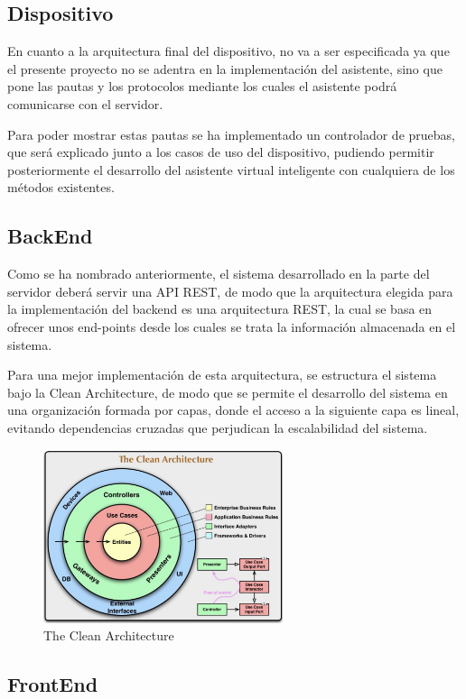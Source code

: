 \subsection{Dispositivo}

En cuanto a la arquitectura final del dispositivo, no va a ser especificada ya que el presente proyecto no se adentra en la implementación del asistente, sino que pone las pautas y los protocolos mediante los cuales el asistente podrá comunicarse con el servidor.

Para poder mostrar estas pautas se ha implementado un controlador de pruebas, que será explicado junto a los casos de uso del dispositivo, pudiendo permitir posteriormente el desarrollo del asistente virtual inteligente con cualquiera de los métodos existentes.

\subsection{BackEnd}

Como se ha nombrado anteriormente, el sistema desarrollado en la parte del servidor deberá servir una API REST, de modo que la arquitectura elegida para la implementación del backend es una arquitectura REST, la cual se basa en ofrecer unos end-points desde los cuales se trata la información almacenada en el sistema.

Para una mejor implementación de esta arquitectura, se estructura el sistema bajo la Clean Architecture, de modo que se permite el desarrollo del sistema en una organización formada por capas, donde el acceso a la siguiente capa es lineal, evitando dependencias cruzadas que perjudican la escalabilidad del sistema.

\begin{figure}[h!]
    \centering
    \includegraphics[width=7cm]{./img/arch/cleanarch.png}
    \caption{The Clean Architecture}
    \label{fig:cleanarch}
\end{figure}

\subsection{FrontEnd}

